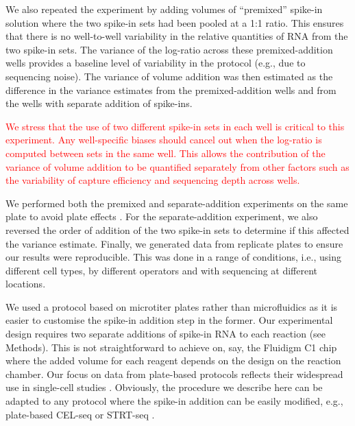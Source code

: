 \documentclass{article}
\newcommand{\revised}[1]{\textcolor{red}{#1}}
\begin{document}
We also repeated the experiment by adding volumes of ``premixed'' spike-in solution where the two spike-in sets had been pooled at a 1:1 ratio.
This ensures that there is no well-to-well variability in the relative quantities of RNA from the two spike-in sets.
The variance of the log-ratio across these premixed-addition wells provides a baseline level of variability in the protocol (e.g., due to sequencing noise).
The variance of volume addition was then estimated as the difference in the variance estimates from the premixed-addition wells and from the wells with separate addition of spike-ins.

\revised{We stress that the use of two different spike-in sets in each well is critical to this experiment.
Any well-specific biases should cancel out when the log-ratio is computed between sets in the same well.
This allows the contribution of the variance of volume addition to be quantified separately from other factors such as the variability of capture efficiency and sequencing depth across wells.}

We performed both the premixed and separate-addition experiments on the same plate to avoid plate effects \autocite{hicks2015widespread,tung2016batch}.
For the separate-addition experiment, we also reversed the order of addition of the two spike-in sets to determine if this affected the variance estimate.
Finally, we generated data from replicate plates to ensure our results were reproducible.
This was done in a range of conditions, i.e., using different cell types, by different operators and with sequencing at different locations.

We used a protocol based on microtiter plates rather than microfluidics as it is easier to customise the spike-in addition step in the former.
Our experimental design requires two separate additions of spike-in RNA to each reaction (see Methods).
This is not straightforward to achieve on, say, the Fluidigm C1 chip where the added volume for each reagent depends on the design on the reaction chamber.
Our focus on data from plate-based protocols reflects their widespread use in single-cell studies \autocite{segerstople2016single,islam2011characterization,wilson2015combined,scialdone2016resolving}.
Obviously, the procedure we describe here can be adapted to any protocol where the spike-in addition can be easily modified, e.g., plate-based CEL-seq \autocite{hashimshony2016celseq2} or STRT-seq \autocite{islam2011characterization}.
\end{document}
